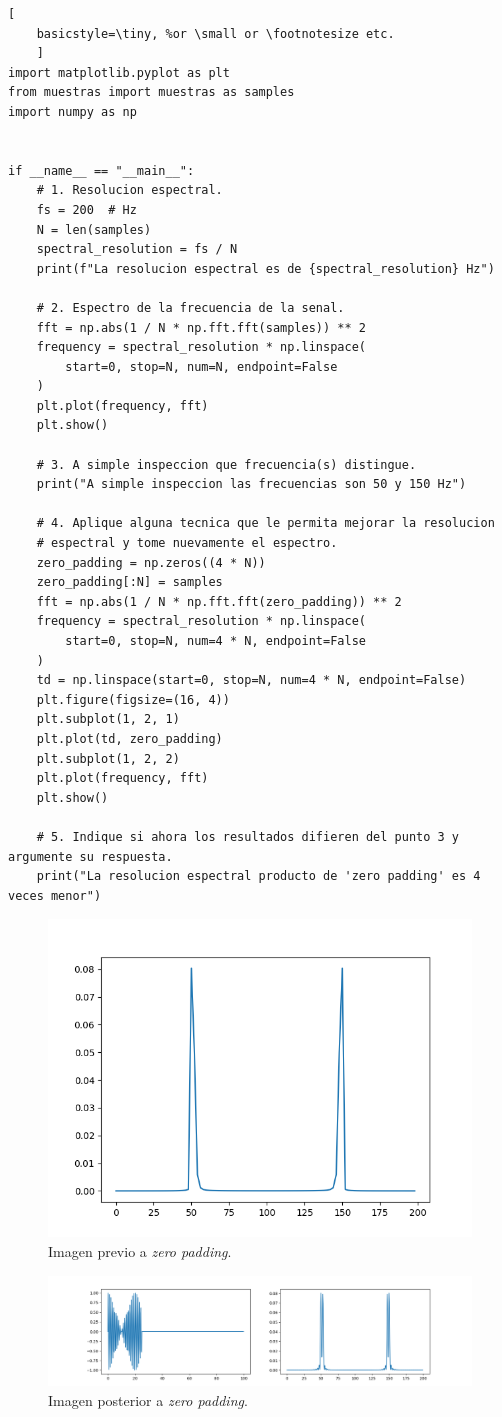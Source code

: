 \documentclass[
    11pt,
    spanish,
	a4paper
]{article}
\begin{document}
\begin{lstlisting}[
    basicstyle=\tiny, %or \small or \footnotesize etc.
    ]
import matplotlib.pyplot as plt
from muestras import muestras as samples
import numpy as np


if __name__ == "__main__":
    # 1. Resolucion espectral.
    fs = 200  # Hz
    N = len(samples)
    spectral_resolution = fs / N
    print(f"La resolucion espectral es de {spectral_resolution} Hz")

    # 2. Espectro de la frecuencia de la senal.
    fft = np.abs(1 / N * np.fft.fft(samples)) ** 2
    frequency = spectral_resolution * np.linspace(
        start=0, stop=N, num=N, endpoint=False
    )
    plt.plot(frequency, fft)
    plt.show()

    # 3. A simple inspeccion que frecuencia(s) distingue.
    print("A simple inspeccion las frecuencias son 50 y 150 Hz")

    # 4. Aplique alguna tecnica que le permita mejorar la resolucion 
    # espectral y tome nuevamente el espectro.
    zero_padding = np.zeros((4 * N))
    zero_padding[:N] = samples
    fft = np.abs(1 / N * np.fft.fft(zero_padding)) ** 2
    frequency = spectral_resolution * np.linspace(
        start=0, stop=N, num=4 * N, endpoint=False
    )
    td = np.linspace(start=0, stop=N, num=4 * N, endpoint=False)
    plt.figure(figsize=(16, 4))
    plt.subplot(1, 2, 1)
    plt.plot(td, zero_padding)
    plt.subplot(1, 2, 2)
    plt.plot(frequency, fft)
    plt.show()

    # 5. Indique si ahora los resultados difieren del punto 3 y argumente su respuesta. 
    print("La resolucion espectral producto de 'zero padding' es 4 veces menor")
\end{lstlisting}

\begin{figure}[htbp]
	\centering
	\includegraphics[width=\textwidth]{img/parte2_1.png}
	\caption{Imagen previo a \emph{zero padding}.}
	\label{fig:parte2v1}
\end{figure}

\begin{figure}[htbp]
	\centering
	\includegraphics[width=\textwidth]{img/parte2_2.png}
	\caption{Imagen posterior a \emph{zero padding}.}
	\label{fig:parte2v2}
\end{figure}
\end{document}
